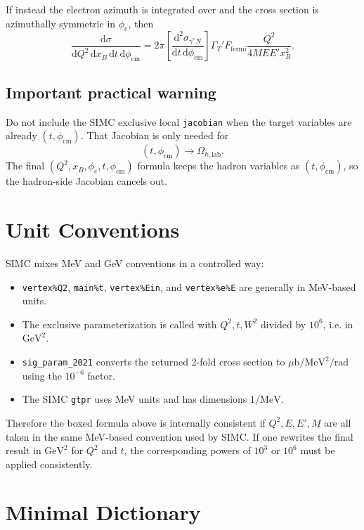\documentclass[11pt]{article}
\newcommand{\dd}{\mathrm{d}}
\newcommand{\ub}{\mu\mathrm{b}}
\newcommand{\MeV}{\mathrm{MeV}}
\newcommand{\GeV}{\mathrm{GeV}}
\newcommand{\phicm}{\phi_{\mathrm{cm}}}
\newcommand{\xb}{x_B}
\newcommand{\Qsq}{Q^2}
\newcommand{\Ebeam}{E}
\newcommand{\Escat}{E'}
\newcommand{\Mtar}{M}
\begin{document}
If instead the electron azimuth is integrated over and the cross section is
azimuthally symmetric in \(\phi_e\), then
\[
  \boxed{
  \frac{\dd\sigma}
       {\dd \Qsq\,\dd\xb\,\dd t\,\dd\phicm}
  =
  2\pi
  \left[
    \frac{\dd^2\sigma_{\gamma^*N}}
         {\dd t\,\dd\phicm}
  \right]
  \Gamma_T'
  F_{\mathrm{fermi}}
  \frac{\Qsq}{4\Mtar\Ebeam\Escat\xb^2}
  }.
\]

\subsection{Important practical warning}

Do not include the SIMC exclusive local \texttt{jacobian} when the target
variables are already \((t,\phicm)\).  That Jacobian is only needed for
\[
  (t,\phicm)\rightarrow \Omega_{h,\mathrm{lab}}.
\]
The final \((\Qsq,\xb,\phi_e,t,\phicm)\) formula keeps the hadron variables as
\((t,\phicm)\), so the hadron-side Jacobian cancels out.

\section{Unit Conventions}

SIMC mixes MeV and GeV conventions in a controlled way:
\begin{itemize}
  \item \texttt{vertex\%Q2}, \texttt{main\%t}, \texttt{vertex\%Ein}, and
        \texttt{vertex\%e\%E} are generally in MeV-based units.
  \item The exclusive parameterization is called with
        \(\Qsq,t,W^2\) divided by \(10^6\), i.e. in \(\GeV^2\).
  \item \texttt{sig\_param\_2021} converts the returned 2-fold cross section
        to \(\ub/\MeV^2/\mathrm{rad}\) using the \(10^{-6}\) factor.
  \item The SIMC \texttt{gtpr} uses MeV units and has dimensions \(1/\MeV\).
\end{itemize}

Therefore the boxed formula above is internally consistent if
\(\Qsq, \Ebeam, \Escat,\Mtar\) are all taken in the same MeV-based convention
used by SIMC.  If one rewrites the final result in \(\GeV^2\) for \(\Qsq\) and
\(t\), the corresponding powers of \(10^3\) or \(10^6\) must be applied
consistently.

\section{Minimal Dictionary}
\end{document}
